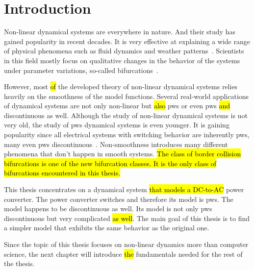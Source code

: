 \chapter{Introduction}
\label{chap:intro}

Non-linear dynamical systems are everywhere in nature.
And their study has gained popularity in recent decades.
It is very effective at explaining a wide range of physical phenomena such as fluid dynamics and weather patterns~\cite{bernardo2008piecewise}.
Scientists in this field mostly focus on qualitative changes in the behavior of the systems under parameter variations, so-called bifurcations~\cite{simpson2010}.

However, most \hl{of} the developed theory of non-linear dynamical systems relies heavily on the smoothness of the model functions.
Several real-world applications of dynamical systems are not only non-linear but \hl{also} \gls{pws} or even \gls{pws} \hl{and} discontinuous as well.
Although the study of non-linear dynamical systems is not very old, the study of \gls{pws} dynamical systems is even younger.
It is gaining popularity since all electrical systems with switching behavior are inherently \gls{pws}, many even \gls{pws} discontinuous~\cite{simpson2010}.
Non-smoothness introduces many different phenomena that don't happen in smooth systems.
\hl{
	The class of border collision bifurcations is one of the new bifurcation classes.
	It is the only class of bifurcations encountered in this thesis.
}

This thesis concentrates on a dynamical system \hl{that models a DC-to-AC} power converter.
The power converter switches and therefore its model is \gls{pws}.
The model happens to be discontinuous as well.
Its model is not only \gls{pws} discontinuous but very complicated \hl{as well}.
The main goal of this thesis is to find a simpler model that exhibits the same behavior as the original one.

Since the topic of this thesis focuses on non-linear dynamics more than computer science, the next chapter will introduce \hl{the} fundamentals needed for the rest of the thesis.
